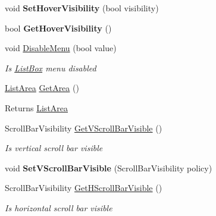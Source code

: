 \begin{DoxyCompactItemize}
void {\bfseries Set\+Hover\+Visibility} (bool visibility)
\item 
\mbox{\label{class_space_v_i_l_1_1_list_box_a17021d9e668e76fb722af658e1c3b42d}} 
bool {\bfseries Get\+Hover\+Visibility} ()
\item 
void \mbox{\hyperlink{class_space_v_i_l_1_1_list_box_a58e7bc1eb9a5846673a2d8b043dc66ed}{Disable\+Menu}} (bool value)
\begin{DoxyCompactList}\small\item\em Is \mbox{\hyperlink{class_space_v_i_l_1_1_list_box}{List\+Box}} menu disabled \end{DoxyCompactList}\item 
\mbox{\label{class_space_v_i_l_1_1_list_box_a518c69be16d0680f9e8e489ea2dec61f}} 
\mbox{\hyperlink{class_space_v_i_l_1_1_list_area}{List\+Area}} \mbox{\hyperlink{class_space_v_i_l_1_1_list_box_a518c69be16d0680f9e8e489ea2dec61f}{Get\+Area}} ()
\begin{DoxyCompactList}\small\item\em \begin{DoxyReturn}{Returns}
\mbox{\hyperlink{class_space_v_i_l_1_1_list_area}{List\+Area}} 
\end{DoxyReturn}
\end{DoxyCompactList}\item 
Scroll\+Bar\+Visibility \mbox{\hyperlink{class_space_v_i_l_1_1_list_box_a73be8ba2a9a2ec0556795defb6c5ae61}{Get\+V\+Scroll\+Bar\+Visible}} ()
\begin{DoxyCompactList}\small\item\em Is vertical scroll bar visible \end{DoxyCompactList}\item 
\mbox{\label{class_space_v_i_l_1_1_list_box_a9e7a7c07600950b84dfdd427f277a19e}} 
void {\bfseries Set\+V\+Scroll\+Bar\+Visible} (Scroll\+Bar\+Visibility policy)
\item 
Scroll\+Bar\+Visibility \mbox{\hyperlink{class_space_v_i_l_1_1_list_box_aa27ff72c81f6d24e1c5bcb325721f07d}{Get\+H\+Scroll\+Bar\+Visible}} ()
\begin{DoxyCompactList}\small\item\em Is horizontal scroll bar visible \end{DoxyCompactList}\item 
\mbox{\label{class_space_v_i_l_1_1_list_box_a31359bba1e5cee94292f2f30a700f599}} 

\end{DoxyCompactItemize}
